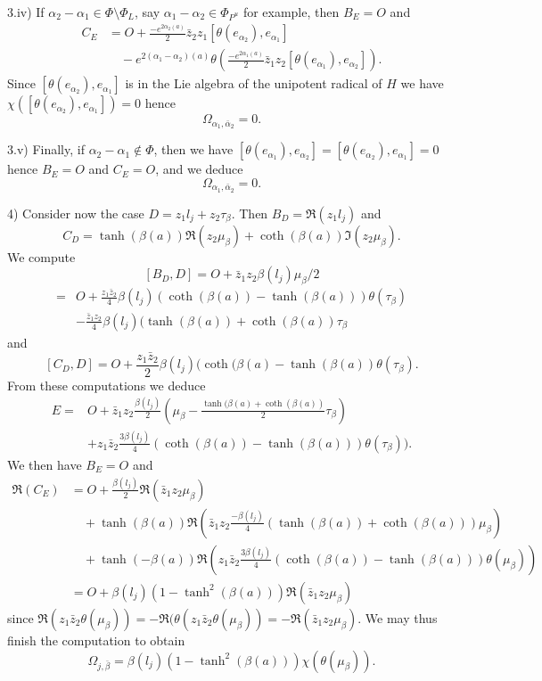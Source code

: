 \documentclass{amsart}
\theoremstyle{definition}
\begin{document}
3.iv) 
If $\alpha_2-\alpha_1 \in \Phi\setminus \Phi_L$, say 
$\alpha_1-\alpha_2\in \Phi_{P^u}$ for example, then $B_E=O$ 
and 
\begin{align*}
C_E & = O + \frac{-e^{2\alpha_2(a)}}{2}\bar{z}_2z_1[\theta(e_{\alpha_2}),e_{\alpha_1}] \\
& \quad - e^{2(\alpha_1-\alpha_2)(a)}\theta(\frac{-e^{2\alpha_1(a)}}{2}\bar{z}_1z_2[\theta(e_{\alpha_1}),e_{\alpha_2}]).
\end{align*}
Since $[\theta(e_{\alpha_2}),e_{\alpha_1}]$ is in the Lie algebra of the 
unipotent radical of $H$ we have $\chi([\theta(e_{\alpha_2}),e_{\alpha_1}])=0$
hence 
\[
\Omega_{\alpha_1,\bar{\alpha}_2}=0.
\]


3.v) 
Finally, if $\alpha_2-\alpha_1 \notin \Phi$, then we have 
$[\theta(e_{\alpha_1}),e_{\alpha_2}] = [\theta(e_{\alpha_2}),e_{\alpha_1}] =0$
hence $B_E=O$ and $C_E=O$, and we deduce 
\[
\Omega_{\alpha_1,\bar{\alpha}_2}=0.
\]


4) %
Consider now the case $D=z_1l_j+z_2\tau_{\beta}$.
Then $B_D=\Re(z_1l_j)$ and 
\[
C_D=\tanh(\beta(a))\Re(z_2\mu_{\beta}) +
\coth(\beta(a))\Im(z_2\mu_{\beta}).
\]
We compute 
\[
[B_D,D]=O+\bar{z}_1z_2\beta(l_j)\mu_{\beta}/2
\]
\begin{align*}
[C_D,B_D]=& O+\frac{z_1\bar{z}_2}{4}\beta(l_j)(\coth(\beta(a))-\tanh(\beta(a)))\theta(\tau_{\beta}) \\
	& -\frac{\bar{z}_1z_2}{4}\beta(l_j)(\tanh(\beta(a))+\coth(\beta(a))\tau_{\beta}
\end{align*}
and 
\[
[C_D,D]=O+\frac{z_1\bar{z}_2}{2}\beta(l_j)(\coth(\beta(a)-\tanh(\beta(a))\theta(\tau_{\beta}).
\]
From these computations we deduce 
\begin{align*}
E = & O + \bar{z}_1z_2 \frac{\beta(l_j)}{2}(\mu_{\beta}-\frac{\tanh(\beta(a)+\coth(\beta(a))}{2}\tau_{\beta}) \\
& +z_1\bar{z}_2\frac{3\beta(l_j)}{4}(\coth(\beta(a))-\tanh(\beta(a)))\theta(\tau_{\beta})).
\end{align*}
We then have $B_E=O$ and 
\begin{align*}
\Re(C_E) & = O+\frac{\beta(l_j)}{2} \Re(\bar{z}_1z_2\mu_{\beta}) \\
& \quad + \tanh(\beta(a))\Re(\bar{z}_1z_2\frac{-\beta(l_j)}{4}(\tanh(\beta(a))+\coth(\beta(a)))\mu_{\beta}) \\
& \quad + \tanh(-\beta(a))\Re(z_1\bar{z}_2\frac{3\beta(l_j)}{4}(\coth(\beta(a))-\tanh(\beta(a)))\theta(\mu_{\beta})) \\
& = O+\beta(l_j)(1-\tanh^2(\beta(a)))\Re(\bar{z}_1z_2\mu_{\beta}) 
\end{align*}
since $\Re(z_1\bar{z}_2\theta(\mu_{\beta}))=-\Re(\theta(z_1\bar{z}_2\theta(\mu_{\beta}))=-\Re(\bar{z}_1z_2\mu_{\beta})$.
We may thus finish the computation to obtain
\[ 
\Omega_{j,\bar{\beta}} = \beta(l_j)(1-\tanh^2(\beta(a))) \chi(\theta(\mu_{\beta})).
\]
\end{document}
